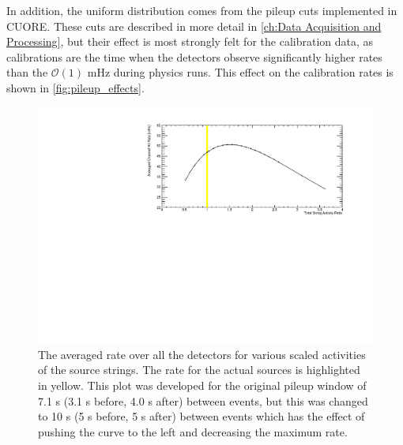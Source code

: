 In addition, the uniform distribution comes from the pileup cuts implemented in CUORE.
These cuts are described in more detail in \autoref{ch:Data Acquisition and Processing}, but their effect is most strongly felt for the calibration data, as calibrations are the time when the detectors observe significantly higher rates than the $\mathcal{O}(1)$ mHz during physics runs.
This effect on the calibration rates is shown in \autoref{fig:pileup_effects}.
\begin{figure}
    \centering
    \includegraphics[width=0.9\linewidth]{Figures/HitRate_Activity.pdf}
    \caption[The averaged rate over all the detectors for various scaled activities of the source strings]
    {The averaged rate over all the detectors for various scaled activities of the source strings.
    The rate for the actual sources is highlighted in yellow.
    This plot was developed for the original pileup window of 7.1 s (3.1 s before, 4.0 s after) between events, but this was changed to 10 s (5 s before, 5 s after) between events which has the effect of pushing the curve to the left and decreasing the maximum rate.}
    \label{fig:pileup_effects}
\end{figure}

